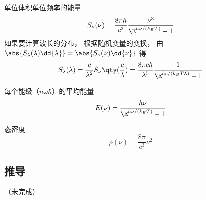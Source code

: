
单位体积单位频率的能量
\begin{equation}
S_\nu(\nu) = \frac{8\pi h}{c^3}\frac{\nu^3}{\E^{h\nu/(k_B T)} - 1}
\end{equation}
如果要计算波长的分布， 根据随机变量的变换， 由 $\abs{S_\lambda(\lambda) \dd{\lambda}} = \abs{S_\nu(\nu)\dd{\nu}}$ 得
\begin{equation}\label{BBdLaw_eq1}
S_\lambda(\lambda) = \frac{c}{\lambda^2}S_\nu\qty(\frac{c}{\lambda}) =
\frac{8\pi ch}{\lambda^5} \frac{1}{\E^{hc/(k_B T\lambda)} - 1}
\end{equation}


每个能级（$n\omega\hbar$）的平均能量
\begin{equation}
E(\nu) = \frac{h\nu}{\E^{h\nu/(k_B T)} - 1}
\end{equation}

态密度
\begin{equation}
\rho(\nu) = \frac{8\pi}{c^3}\nu^2
\end{equation}

\subsection{推导}
（未完成）
